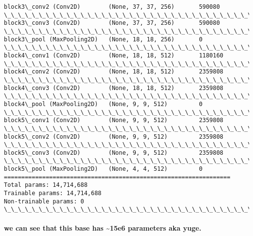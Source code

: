 \documentclass[11pt]{article}
\begin{document}
\begin{Verbatim}[commandchars=\\\{\}]
block3\_conv2 (Conv2D)        (None, 37, 37, 256)       590080    
\_\_\_\_\_\_\_\_\_\_\_\_\_\_\_\_\_\_\_\_\_\_\_\_\_\_\_\_\_\_\_\_\_\_\_\_\_\_\_\_\_\_\_\_\_\_\_\_\_\_\_\_\_\_\_\_\_\_\_\_\_\_\_\_\_
block3\_conv3 (Conv2D)        (None, 37, 37, 256)       590080    
\_\_\_\_\_\_\_\_\_\_\_\_\_\_\_\_\_\_\_\_\_\_\_\_\_\_\_\_\_\_\_\_\_\_\_\_\_\_\_\_\_\_\_\_\_\_\_\_\_\_\_\_\_\_\_\_\_\_\_\_\_\_\_\_\_
block3\_pool (MaxPooling2D)   (None, 18, 18, 256)       0         
\_\_\_\_\_\_\_\_\_\_\_\_\_\_\_\_\_\_\_\_\_\_\_\_\_\_\_\_\_\_\_\_\_\_\_\_\_\_\_\_\_\_\_\_\_\_\_\_\_\_\_\_\_\_\_\_\_\_\_\_\_\_\_\_\_
block4\_conv1 (Conv2D)        (None, 18, 18, 512)       1180160   
\_\_\_\_\_\_\_\_\_\_\_\_\_\_\_\_\_\_\_\_\_\_\_\_\_\_\_\_\_\_\_\_\_\_\_\_\_\_\_\_\_\_\_\_\_\_\_\_\_\_\_\_\_\_\_\_\_\_\_\_\_\_\_\_\_
block4\_conv2 (Conv2D)        (None, 18, 18, 512)       2359808   
\_\_\_\_\_\_\_\_\_\_\_\_\_\_\_\_\_\_\_\_\_\_\_\_\_\_\_\_\_\_\_\_\_\_\_\_\_\_\_\_\_\_\_\_\_\_\_\_\_\_\_\_\_\_\_\_\_\_\_\_\_\_\_\_\_
block4\_conv3 (Conv2D)        (None, 18, 18, 512)       2359808   
\_\_\_\_\_\_\_\_\_\_\_\_\_\_\_\_\_\_\_\_\_\_\_\_\_\_\_\_\_\_\_\_\_\_\_\_\_\_\_\_\_\_\_\_\_\_\_\_\_\_\_\_\_\_\_\_\_\_\_\_\_\_\_\_\_
block4\_pool (MaxPooling2D)   (None, 9, 9, 512)         0         
\_\_\_\_\_\_\_\_\_\_\_\_\_\_\_\_\_\_\_\_\_\_\_\_\_\_\_\_\_\_\_\_\_\_\_\_\_\_\_\_\_\_\_\_\_\_\_\_\_\_\_\_\_\_\_\_\_\_\_\_\_\_\_\_\_
block5\_conv1 (Conv2D)        (None, 9, 9, 512)         2359808   
\_\_\_\_\_\_\_\_\_\_\_\_\_\_\_\_\_\_\_\_\_\_\_\_\_\_\_\_\_\_\_\_\_\_\_\_\_\_\_\_\_\_\_\_\_\_\_\_\_\_\_\_\_\_\_\_\_\_\_\_\_\_\_\_\_
block5\_conv2 (Conv2D)        (None, 9, 9, 512)         2359808   
\_\_\_\_\_\_\_\_\_\_\_\_\_\_\_\_\_\_\_\_\_\_\_\_\_\_\_\_\_\_\_\_\_\_\_\_\_\_\_\_\_\_\_\_\_\_\_\_\_\_\_\_\_\_\_\_\_\_\_\_\_\_\_\_\_
block5\_conv3 (Conv2D)        (None, 9, 9, 512)         2359808   
\_\_\_\_\_\_\_\_\_\_\_\_\_\_\_\_\_\_\_\_\_\_\_\_\_\_\_\_\_\_\_\_\_\_\_\_\_\_\_\_\_\_\_\_\_\_\_\_\_\_\_\_\_\_\_\_\_\_\_\_\_\_\_\_\_
block5\_pool (MaxPooling2D)   (None, 4, 4, 512)         0         
=================================================================
Total params: 14,714,688
Trainable params: 14,714,688
Non-trainable params: 0
\_\_\_\_\_\_\_\_\_\_\_\_\_\_\_\_\_\_\_\_\_\_\_\_\_\_\_\_\_\_\_\_\_\_\_\_\_\_\_\_\_\_\_\_\_\_\_\_\_\_\_\_\_\_\_\_\_\_\_\_\_\_\_\_\_

    \end{Verbatim}

    \paragraph{we can see that this base has \textasciitilde{}15e6
parameters aka
yuge.}\label{we-can-see-that-this-base-has-15e6-parameters-aka-yuge.}
\end{document}
